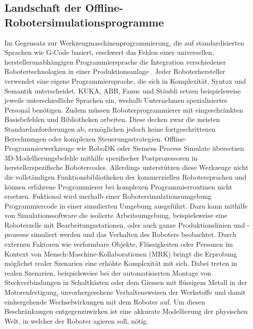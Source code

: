 \subsection{Landschaft der Offline-Robotersimulationsprogramme} Im Gegensatz zur
Werkzeugmaschinenprogrammierung, die auf standardisierten Sprachen wie G-Code
basiert, erschwert das Fehlen einer universellen, herstellerunabhängigen
Programmiersprache die Integration verschiedener Robotertechnologien in einer
Produktionsanlage . Jeder Roboterhersteller verwendet
eine eigene Programmiersprache, die sich in Komplexität, Syntax und Semantik
unterscheidet. KUKA, ABB, Fanuc und Stäubli setzen beispielsweise jeweils
unterschiedliche Sprachen ein, weshalb Unternehmen spezialisiertes Personal
benötigen. Zudem müssen Roboterprogrammierer mit eingeschränkten Basisbefehlen
und Bibliotheken arbeiten. Diese decken zwar die meisten Standardanforderungen
ab, ermöglichen jedoch keine fortgeschrittenen Berechnungen oder komplexen
Steuerungsstrategien. Offline-Programmierwerkzeuge wie RoboDK oder Siemens
Process Simulate übersetzen 3D-Modellierungsbefehle mithilfe spezifischer
Postprozessoren in herstellerspezifische Robotercodes. Allerdings unterstützen
diese Werkzeuge nicht die vollständigen Funktionsbibliotheken der kommerziellen
Robotersprachen und können erfahrene Programmierer bei komplexen
Programmierroutinen nicht ersetzen. Fuktional wird
inerhalb einer Robotersimulationsumgebung Programmiercode in einer simulierten
Umgebung ausgeführt. Dazu kann mithilfe von Simulationssoftware die isolierte
Arbeitsumgebung, beispielsweise eine Roboterzelle mit Bearbeitungsstationen,
oder auch ganze Produktionslinien und -prozesse simuliert werden und das
Verhalten des Roboters beobachtet. Durch externen Faktoren wie verformbare
Objekte, Flüssigkeiten oder Personen im Kontext von
Mensch-Maschine-Kollaborationen (MRK) bringt die Erprobung möglichst realer
Szenarien eine erhöhte Komplexität mit sich. Dabei treten in realen Szenarien,
beispielsweise bei der automatisierten Montage von Steckverbindungen in
Schaltkästen oder dem Giessen mit flüssigem Metall in der Motorenfertigung,
unvorhergesehene Verhaltensweisen der Werkstoffe und damit einhergehende
Wechselwirkungen mit dem Roboter auf. Um diesen Beschränkungen entgegenzuwirken
ist eine akkurate Modellierung der physischen Welt, in welcher der Roboter
agieren soll, nötig.

